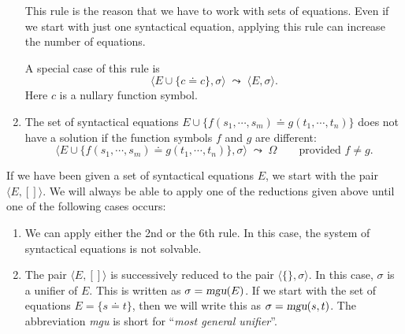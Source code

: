 \begin{enumerate}
      This rule is the reason that we have to work with sets of equations.  Even if we start with just
      one syntactical equation, applying this rule can increase the number of equations.

      A special case of this rule is 
      \[ \Big\langle E \cup \big\{ c \doteq c \big\}, \sigma \Big\rangle \;\leadsto\; 
         \Big\langle E, \sigma \Big\rangle.
      \]
      Here $c$ is a nullary function symbol.
\item The set of syntactical equations $E \cup \big\{ f(s_1,\cdots,s_m) \doteq g(t_1,\cdots,t_n) \big\}$
      does not have a solution if the function symbols  $f$ and $g$ are different:
      \[ \Big\langle E \cup \big\{ f(s_1,\cdots,s_m) \doteq g(t_1,\cdots,t_n) \big\},
      \sigma \Big\rangle \;\leadsto\; \Omega \qquad \mbox{provided $f \not= g$}. \]
\end{enumerate}
If we have been given a set of syntactical equations $E$, we start with the pair 
$\langle E, []\rangle$.  We will always be able to apply one of the reductions given above until one of
the following cases occurs:
\begin{enumerate}
\item We can apply either the 2nd or the 6th rule.  In this case, the system of syntactical
      equations is not solvable.
\item The pair  $\langle E, [] \rangle$ is successively reduced to the pair  $\langle \{\}, \sigma\rangle$.
      In this case,  $\sigma$ is a unifier of  $E$.  This is written as  $\sigma = \textsl{mgu}(E)$.
      If we start with the set of equations $E = \{ s \doteq t \}$, then we will write this as $\sigma = \textsl{mgu}(s, t)$.
      The abbreviation \textsl{mgu} is short for ``\emph{most general unifier}''.
\end{enumerate}

